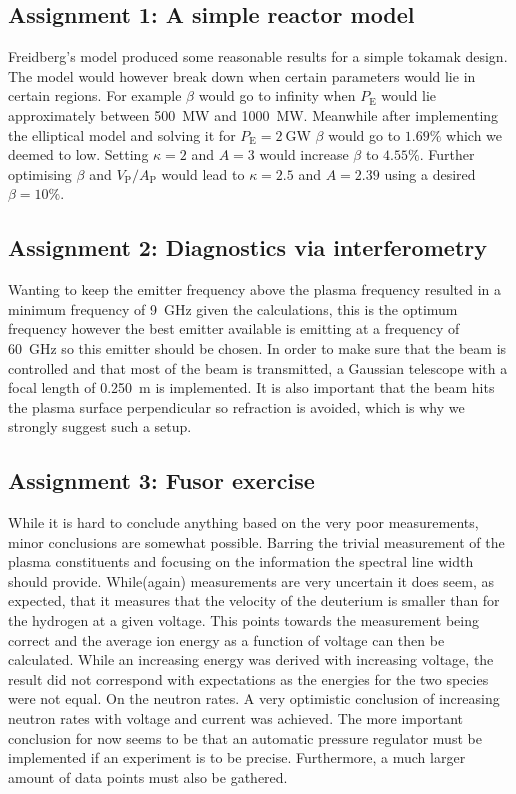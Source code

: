 \subsection{Assignment 1: A simple reactor model}
Freidberg's model produced some reasonable results for a simple tokamak design. The model would however break down when certain parameters would lie in certain regions. For example $\beta$ would go to infinity when $P_{\mathrm{E}}$ would lie approximately between \SI{500}{\mega\watt} and \SI{1000}{\mega\watt}. Meanwhile after implementing the elliptical model and solving it for $P_{\mathrm{E}}=\SI{2}{\giga\watt}$ $\beta$ would go to $1.69\%$ which we deemed to low. Setting $\kappa=2$ and $A=3$ would increase $\beta$ to $4.55\%$. Further optimising \(\beta\) and \(V_{\mathrm{P}}/A_{\mathrm{P}}\) would lead to \(\kappa=2.5\) and \(A=2.39\) using a desired \(\beta=10\%\).
\subsection{Assignment 2: Diagnostics via interferometry}
Wanting to keep the emitter frequency above the plasma frequency resulted in a minimum frequency of \SI{9}{\giga\hertz} given the calculations, this is the optimum frequency however the best emitter available is emitting at a frequency of \SI{60}{\giga\hertz} so this emitter should be chosen. In order to make sure that the beam is controlled and that most of the beam is transmitted, a Gaussian telescope with a focal length of \SI{0.250}{\meter} is implemented. It is also important that the beam hits the plasma surface perpendicular so refraction is avoided, which is why we strongly suggest such a setup.
\subsection{Assignment 3: Fusor exercise}
While it is hard to conclude anything based on the very poor measurements, minor conclusions are somewhat possible. Barring the trivial measurement of the plasma constituents and focusing on the information the spectral line width should provide. While(again) measurements are very uncertain it does seem, as expected, that it measures that the velocity of the deuterium is smaller than for the hydrogen at a given voltage. This points towards the measurement being correct and the average ion energy as a function of voltage can then be calculated. While an increasing energy was derived with increasing voltage, the result did not correspond with expectations as the energies for the two species were not equal. On the neutron rates. A very optimistic conclusion of increasing neutron rates with voltage and current was achieved. The more important conclusion for now seems to be that an automatic pressure regulator must be implemented if an experiment is to be precise. Furthermore, a much larger amount of data points must also be gathered.
